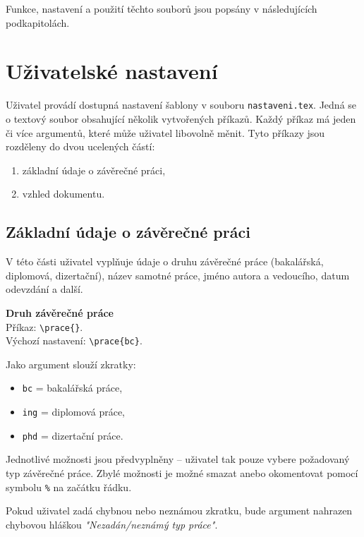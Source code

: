Funkce, nastavení a použití těchto souborů jsou popsány v následujících podkapitolách.



\section{Uživatelské nastavení}
\label{sec:nastaveni}
Uživatel provádí dostupná nastavení šablony v souboru \verb|nastaveni.tex|. Jedná se o textový soubor obsahující několik vytvořených příkazů. Každý příkaz má jeden či více argumentů, které může uživatel libovolně měnit. Tyto příkazy jsou rozděleny do dvou ucelených částí:

\begin{enumerate}
	\item základní údaje o závěrečné práci,
	\item vzhled dokumentu.
\end{enumerate}



\subsection{Základní údaje o závěrečné práci}
V této části uživatel vyplňuje údaje o druhu závěrečné práce (bakalářská, diplomová, dizertační), název samotné práce, jméno autora a vedoucího, datum odevzdání a další.

\vspace{8pt}
\textbf{Druh závěrečné práce}\\
Příkaz: \verb|\prace{}|.\\
Výchozí nastavení: \verb|\prace{bc}|.

\newpage
Jako argument slouží zkratky:

\begin{itemize}[label={-}]
	\item \verb|bc| = bakalářská práce,
	\item \verb|ing| = diplomová práce,
	\item \verb|phd| = dizertační práce.
\end{itemize}

Jednotlivé možnosti jsou předvyplněny -- uživatel tak pouze vybere požadovaný typ závěrečné práce. Zbylé možnosti je možné smazat anebo okomentovat pomocí symbolu \verb|%| na začátku řádku.

Pokud uživatel zadá chybnou nebo neznámou zkratku, bude argument nahrazen chybovou hláškou \textit{"Nezadán/neznámý typ práce"}.

